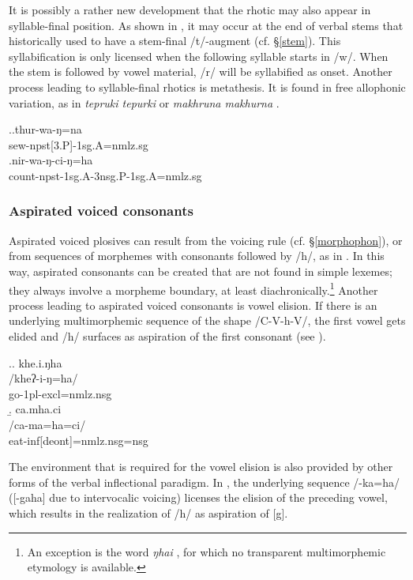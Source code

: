 It is possibly a rather new development that the rhotic may also appear in syllable-final position. As shown in  \Next, it may occur at the end of verbal stems that historically used to have a stem-final /t/-augment (cf. §\ref{stem}). This syllabification is only licensed when the following syllable starts in /w/. When the stem is followed by vowel material, /r/ will be syllabified as onset. Another process leading to syllable-final rhotics is metathesis. It is found in free allophonic variation, as in \emph{tepruki \ti tepurki}  or \emph{makhruna \ti makhurna} . 


\ex.\ag.thur-wa-ŋ=na\\
sew{\sc -npst[3.P]-1sg.A=nmlz.sg}\\
\bg.nir-wa-ŋ-ci-ŋ=ha\\
count{\sc -npst-1sg.A-3nsg.P-1sg.A=nmlz.sg}\\


 
\subsubsection{Aspirated voiced consonants}\label{asp-voiced}

Aspirated voiced plosives can result from the voicing rule (cf. §\ref{morphophon}), or from sequences of morphemes with consonants followed by /h/, as in \Next[a]. In this way, aspirated consonants can be created that are not found in simple lexemes; they always involve a morpheme boundary, at least diachronically.\footnote{An exception is the word \emph{ŋhai} , for which no transparent multimorphemic etymology is available.} Another process leading to aspirated voiced consonants is vowel elision. If there is an underlying multimorphemic sequence of the shape /C-V-h-V/, the first vowel gets elided and /h/ surfaces as aspiration of the first consonant (see \Next[b]). 


\ex.\a. \glll khe.i.ŋha\\
/kheʔ-i-ŋ=ha/\\
go{\sc [pst]-1pl-excl=nmlz.nsg}\\
\b. \glll ca.mha.ci\\
/ca-ma=ha=ci/\\
eat{\sc -inf[deont]=nmlz.nsg=nsg}\\


The environment that is required for the vowel elision is also provided by other forms of the verbal inflectional paradigm. In \Next, the underlying sequence /-ka=ha/ ([-gaha] due to intervocalic voicing) licenses the elision of the preceding vowel, which results in the realization of /h/ as aspiration of [g].


